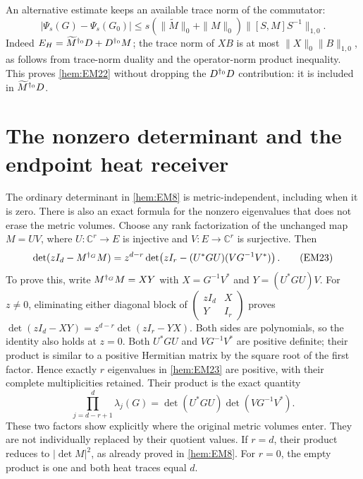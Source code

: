An alternative estimate keeps an available trace norm of the
commutator:
\begin{equation}
 |\Psi_s(G)-\Psi_s(G_0)|
 \le s(\|\widetilde M\|_0+\|M\|_0)\|[S,M]S^{-1}\|_{1,0}.
 \tag{EM22}\label{hem:EM22}
\end{equation}
Indeed \(E_H=\widetilde M^{\dagger_0}D+D^{\dagger_0}M\); the trace norm
of \(XB\) is at most \(\|X\|_0\|B\|_{1,0}\), as follows from trace-norm
duality and the operator-norm product inequality. This proves
\eqref{hem:EM22} without dropping the \(D^{\dagger_0}D\) contribution:
it is included in \(\widetilde M^{\dagger_0}D\).

\section{The nonzero determinant and the endpoint heat receiver}

The ordinary determinant in \eqref{hem:EM8} is metric-independent, including
when it is zero. There is also an exact formula for the nonzero
eigenvalues that does not erase the metric volumes. Choose any rank
factorization of the unchanged map
\(M=UV\), where \(U:\mathbb C^r\to E\) is injective and
\(V:E\to\mathbb C^r\) is surjective. Then
\begin{equation}
 \det(zI_d-M^{\dagger_G}M)
 =z^{d-r}\det\!\left(zI_r-(U^*GU)(VG^{-1}V^*)\right).
 \tag{EM23}\label{hem:EM23}
\end{equation}
To prove this, write \(M^{\dagger_G}M=XY\) with
\(X=G^{-1}V^*\) and \(Y=(U^*GU)V\).
For \(z\ne0\), eliminating either diagonal block of
\(\left(\begin{smallmatrix}zI_d&X\\Y&I_r\end{smallmatrix}\right)\)
proves
\(\det(zI_d-XY)=z^{d-r}\det(zI_r-YX)\).
Both sides are polynomials, so the identity also holds at \(z=0\).
Both \(U^*GU\) and \(VG^{-1}V^*\) are positive definite; their product
is similar to a positive Hermitian matrix by the square root of the
first factor. Hence exactly \(r\) eigenvalues in \eqref{hem:EM23} are
positive, with their complete multiplicities retained.
Their product is the exact quantity
\begin{equation}
 \prod_{j=d-r+1}^{d}\lambda_j(G)
     =\det(U^*GU)\det(VG^{-1}V^*).
 \tag{EM24}\label{hem:EM24}
\end{equation}
These two factors show explicitly where the original metric volumes
enter. They are not individually replaced by their quotient values.
If \(r=d\), their product reduces to \(|\det M|^2\), as already
proved in \eqref{hem:EM8}. For \(r=0\), the empty product is one and both
heat traces equal \(d\).

